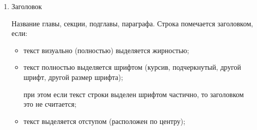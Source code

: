 \documentclass[a4paper,12pt]{article}
\makeatletter
\newenvironment{restoretext}%
    {\@parboxrestore%
     \begin{adjustwidth}{}{\leftmargin}%
    }{\end{adjustwidth}}
\makeatother
\begin{document}
\begin{enumerate}

	\item Заголовок

	Название главы, секции, подглавы, параграфа. Строка помечается заголовком, если:

	\begin{itemize}
		\item текст визуально (полностью) выделяется жирностью;

		\vspace{0.5cm}

		\begin{restoretext}
		\end{restoretext}

		\item текст полностью выделяется шрифтом (курсив, подчеркнутый, другой шрифт, другой размер шрифта);

		\vspace{0.5cm}

		\begin{restoretext}
		\end{restoretext}

		при этом если текст строки выделен шрифтом частично, то заголовком это не считается;

		\vspace{0.5cm}

		\begin{restoretext}
		\end{restoretext}

		\item текст выделяется отступом (расположен по центру);

		\vspace{0.5cm}

		\begin{restoretext}
		\end{restoretext}


\end{itemize}
\end{enumerate}
\end{document}

